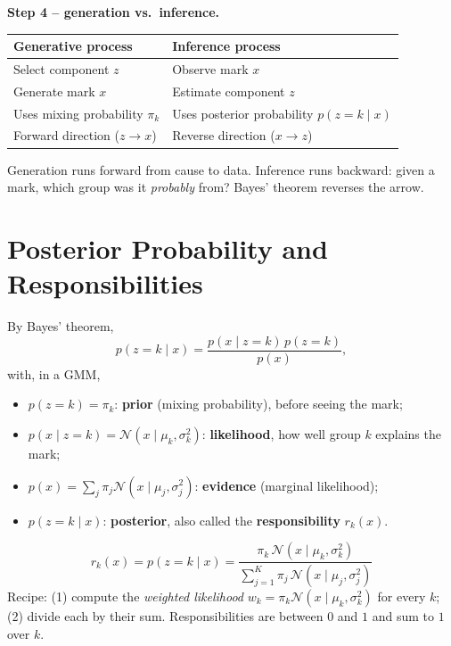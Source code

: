 \documentclass[11pt,a4paper]{article}
\newcommand{\N}{\mathcal{N}}
\begin{document}
\textbf{Step 4 -- generation vs.\ inference.}
\begin{center}
\begin{tabular}{@{}ll@{}}
\toprule
Generative process & Inference process\\
\midrule
Select component $z$ & Observe mark $x$\\
Generate mark $x$ & Estimate component $z$\\
Uses mixing probability $\pi_k$ & Uses posterior probability $p(z=k\mid x)$\\
Forward direction ($z\to x$) & Reverse direction ($x\to z$)\\
\bottomrule
\end{tabular}
\end{center}
Generation runs forward from cause to data. Inference runs backward: given a mark, which group was it \emph{probably} from? Bayes' theorem reverses the arrow.

\section{Posterior Probability and Responsibilities}

By Bayes' theorem,
\[
p(z=k\mid x)=\frac{p(x\mid z=k)\,p(z=k)}{p(x)},
\]
with, in a GMM,
\begin{itemize}[nosep]
\item $p(z=k)=\pi_k$: \textbf{prior} (mixing probability), before seeing the mark;
\item $p(x\mid z=k)=\N(x\mid\mu_k,\sigma_k^2)$: \textbf{likelihood}, how well group $k$ explains the mark;
\item $p(x)=\sum_j\pi_j\N(x\mid\mu_j,\sigma_j^2)$: \textbf{evidence} (marginal likelihood);
\item $p(z=k\mid x)$: \textbf{posterior}, also called the \textbf{responsibility} $r_k(x)$.
\end{itemize}
\[
\boxed{\;r_k(x)=p(z=k\mid x)=\frac{\pi_k\,\N(x\mid\mu_k,\sigma_k^2)}{\sum_{j=1}^K\pi_j\,\N(x\mid\mu_j,\sigma_j^2)}\;}
\]
Recipe: (1) compute the \emph{weighted likelihood} $w_k=\pi_k\N(x\mid\mu_k,\sigma_k^2)$ for every $k$; (2) divide each by their sum. Responsibilities are between $0$ and $1$ and sum to $1$ over $k$.
\end{document}
